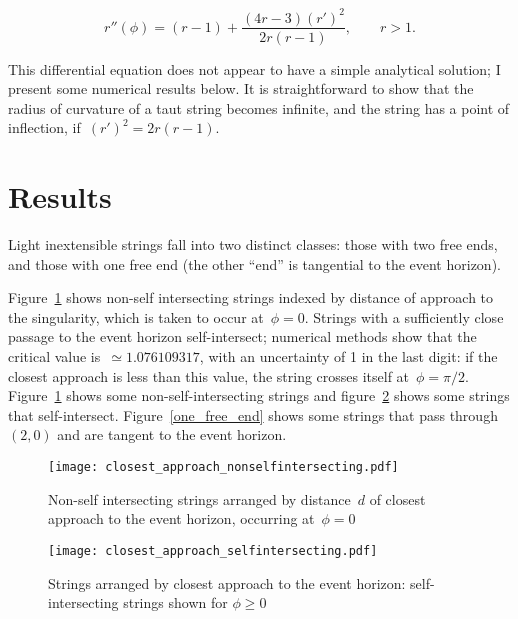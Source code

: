 \documentclass[times,twocolumn,final]{elsarticle}
\begin{document}
\begin{equation}\label{rdashdash}
  r''\left(\phi\right) =
  (r-1) + \frac{(4r-3)\left(r'\right)^2}{2r\left(r-1\right)},\qquad r>1.
\end{equation}

This differential equation does not appear to have a simple analytical
solution; I present some numerical results below.  It is
straightforward to show that the radius of curvature of a taut string
becomes infinite, and the string has a point of inflection,
if~$\left(r'\right)^2=2r\left(r-1\right)$.

\section{Results}
Light inextensible strings fall into two distinct classes: those with
two free ends, and those with one free end (the other ``end'' is
tangential to the event horizon).  

Figure~\ref{closest_approach_non_self_intersecting} shows non-self
intersecting strings indexed by distance of approach to the
singularity, which is taken to occur at~$\phi=0$.  Strings with a
sufficiently close passage to the event horizon self-intersect;
numerical methods show that the critical value is~$\simeq
1.076109317$, with an uncertainty of 1 in the last digit: if the
closest approach is less than this value, the string crosses itself
at~$\phi=\pi/2$.  Figure~\ref{closest_approach_non_self_intersecting}
shows some non-self-intersecting strings and
figure~\ref{closest_approach_self_intersecting} shows some strings
that self-intersect.  Figure~\ref{one_free_end} shows some strings
that pass through~$\left(2,0\right)$ and are tangent to the event horizon.

\begin{figure}[h!]
\centering
\texttt{[image: closest\_approach\_nonselfintersecting.pdf]}
\caption{Non-self intersecting strings arranged by distance~$d$ of
  closest approach to the event horizon, occurring at~$\phi=0$}
\label{closest_approach_non_self_intersecting}
\end{figure}

\begin{figure}[h!]
\centering
\texttt{[image: closest\_approach\_selfintersecting.pdf]}
\caption{Strings arranged by closest approach to the event horizon:
 self-intersecting strings shown for $\phi\geq 0$}
\label{closest_approach_self_intersecting}
\end{figure}
\end{document}
